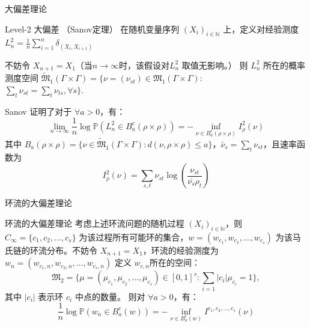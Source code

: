 \documentclass{beamer}
\begin{document}
	\begin{frame}{大偏差理论}
		\begin{block}{Level-2 大偏差 （Sanov定理）}
			在随机变量序列 $(\mathit{X}_i)_{i\in \mathbb{N}}$ 上，定义对经验测度
			$\mathit{L}_n^2 = \frac{1}{n} \sum_{i=1}^n \delta_{(\mathit{X}_i, \mathit{X}_{i+1})}$
			
			不妨令 $\mathit{X}_{n+1} = \mathit{X}_1$（当$n\rightarrow \infty$时，该假设对$\mathit{L}_n^2$ 取值无影响。）
			则 $\mathit{L}_n^2$ 所在的概率测度空间
			$\widetilde{\mathfrak{M}}_1(\Gamma \times \Gamma) = \{\nu=(\nu_{st}) \in \mathfrak{M}_1(\Gamma \times \Gamma):$ \\$ \sum_{t} \nu_{st} = \sum_{t} \nu_{ts}, \forall s\}.$
		
			Sanov 证明了对于 $\forall a > 0$，有：
			$$
			\lim_{n \rightarrow \infty} \frac{1}{n} \log \mathbb{P}(\mathit{L}_n^2 \in B_a^c(\rho \times \rho))
			= - \inf_{\nu \in B_a^c(\rho \times \rho)} \mathit{I}_{\rho}^2(\nu)
			$$
			其中 $B_a(\rho \times \rho) = \{\nu \in \widetilde{\mathfrak{M}}_1(\Gamma \times \Gamma): d(\nu, \rho \times \rho) \le a\}$，$\bar{\nu}_s = \sum_t \nu_{st}$，且速率函数为
			$$
			\mathit{I}_{\rho}^2(\nu) = \sum_{s,t} \nu_{st} \log\left(\frac{\nu_{st}}{\bar{\nu_s}\rho_t}\right)
			$$
		\end{block} 
	\end{frame}

	\begin{frame}{环流的大偏差理论}
		\begin{block}{环流的大偏差理论}
			考虑上述环流问题的随机过程 $(\mathit{X}_i)_{i\in \mathbb{N}}$，则 $C_{\infty}=\{c_1, c_2, \dots, c_s\}$ 为该过程所有可能环的集合，$\mathit{w} = \left(\mathit{w}_{c_1}, \mathit{w}_{c_2}, \dots, \mathit{w}_{c_s}\right)$ 为该马氏链的环流分布。不妨令 $\mathit{X}_{n+1} = \mathit{X}_1$，环流的经验测度为 $\mathit{w}_n = \left(\mathit{w}_{c_1, n}, \mathit{w}_{c_2, n}, \dots, \mathit{w}_{c_s, n}\right)$
			定义 $\mathit{w}_{c, n}$所在的空间：
			$$
			\mathfrak{M}_2 = \{\mu=\left(\mu_{c_1}, \mu_{c_2}, \dots, \mu_{c_s}\right)\in \left[0, 1\right]^s: \sum_{i=1} |c_i| \mu_{c_i}=1\}, 
			$$
			其中 $|c_i|$ 表示环 $c_i$ 中点的数量。
			则对 $\forall a >0$，有：
			$$
			\frac{1}{n} \log \mathbb{P} \left(\mathit{w}_n \in B_a^c(\mathit{w})\right) = - \inf_{\nu \in B_a^c(\mathit{w})} \mathit{I}^{c_1, c_2, \dots, c_s}(\nu)
			$$
		\end{block}
	\end{frame}
\end{document}
